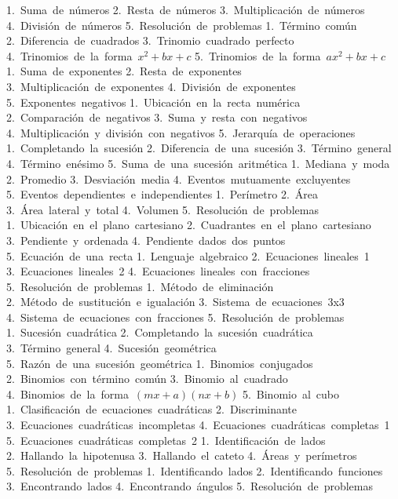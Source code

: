 1.~Suma~de~números
2.~Resta~de~números
3.~Multiplicación~de~números
4.~División~de~números
5.~Resolución~de~problemas
1.~Término~común
2.~Diferencia~de~cuadrados
3.~Trinomio~cuadrado~perfecto
4.~Trinomios~de~la~forma~$x^2+bx+c$
5.~Trinomios~de~la~forma~$ax^2+bx+c$
1.~Suma~de~exponentes
2.~Resta~de~exponentes
3.~Multiplicación~de~exponentes
4.~División~de~exponentes
5.~Exponentes~negativos
1.~Ubicación~en~la~recta~numérica
2.~Comparación~de~negativos
3.~Suma~y~resta~con~negativos
4.~Multiplicación~y~división~con~negativos
5.~Jerarquía~de~operaciones
1.~Completando~la~sucesión
2.~Diferencia~de~una~sucesión
3.~Término~general
4.~Término~enésimo
5.~Suma~de~una~sucesión~aritmética
1.~Mediana~y~moda
2.~Promedio
3.~Desviación~media
4.~Eventos~mutuamente~excluyentes
5.~Eventos~dependientes~e~independientes
1.~Perímetro
2.~Área
3.~Área~lateral~y~total
4.~Volumen
5.~Resolución~de~problemas
1.~Ubicación~en~el~plano~cartesiano
2.~Cuadrantes~en~el~plano~cartesiano
3.~Pendiente~y~ordenada
4.~Pendiente~dados~dos~puntos
5.~Ecuación~de~una~recta
1.~Lenguaje~algebraico
2.~Ecuaciones~lineales~1
3.~Ecuaciones~lineales~2
4.~Ecuaciones~lineales~con~fracciones
5.~Resolución~de~problemas
1.~Método~de~eliminación
2.~Método~de~sustitución~e~igualación
3.~Sistema~de~ecuaciones~3x3
4.~Sistema~de~ecuaciones~con~fracciones
5.~Resolución~de~problemas
1.~Sucesión~cuadrática
2.~Completando~la~sucesión~cuadrática
3.~Término~general
4.~Sucesión~geométrica
5.~Razón~de~una~sucesión~geométrica
1.~Binomios~conjugados
2.~Binomios~con~término~común
3.~Binomio~al~cuadrado
4.~Binomios~de~la~forma~$(mx+a)(nx+b)$
5.~Binomio~al~cubo
1.~Clasificación~de~ecuaciones~cuadráticas
2.~Discriminante
3.~Ecuaciones~cuadráticas~incompletas
4.~Ecuaciones~cuadráticas~completas~1
5.~Ecuaciones~cuadráticas~completas~2
1.~Identificación~de~lados
2.~Hallando~la~hipotenusa
3.~Hallando~el~cateto
4.~Áreas~y~perímetros
5.~Resolución~de~problemas
1.~Identificando~lados
2.~Identificando~funciones
3.~Encontrando~lados
4.~Encontrando~ángulos
5.~Resolución~de~problemas